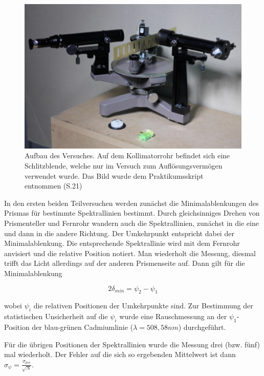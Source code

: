 \documentclass[12pt,a4paper]{article}
\begin{document}
	\begin{figure}
		\begin{center}
			\includegraphics[scale=1.0]{Bilder/AufbauPrisma}
			\caption{Aufbau des Versuches. Auf dem Kollimatorrohr befindet sich eine Schlitzblende, welche nur im Versuch zum Auflösungsvermögen verwendet wurde. Das Bild wurde dem Praktikumsskript entnommen (S.21)}
			\label{fig:AufbauPrisma}
		\end{center}
	\end{figure}
	
	In den ersten beiden Teilversuchen werden zunächst die Minimalablenkungen des Prismas für bestimmte Spektrallinien bestimmt.
	Durch gleichsinniges Drehen von Prismenteller und Fernrohr wandern auch die Spektrallinien, zunächst in die eine und dann in die andere Richtung. Der Umkehrpunkt entspricht dabei der Minimalablenkung. Die entsprechende Spektrallinie wird mit dem Fernrohr anvisiert und die relative Position notiert. Man wiederholt die Messung, diesmal trifft das Licht allerdings auf der anderen Prismenseite auf. Dann gilt für die Minimalablenkung
	
	\begin{equation}
	2 \delta_{min} = \psi_2-\psi_1
	\end{equation}
	
	wobei $\psi_i$ die relativen Positionen der Umkehrpunkte sind.
	Zur Bestimmung der statistischen Unsicherheit auf die $\psi_i$ wurde eine Rauschmessung an der $\psi_1$-Position der blau-grünen Cadmiumlinie ($\lambda=508,58nm$) durchgeführt.
	
	Für die übrigen Positionen der Spektrallinien wurde die Messung drei (bzw. fünf) mal wiederholt. Der Fehler auf die sich so ergebenden Mittelwert ist dann $\sigma_{\psi}=\frac{\sigma_{psi}}{\sqrt{N}}$.
	
\end{document}

